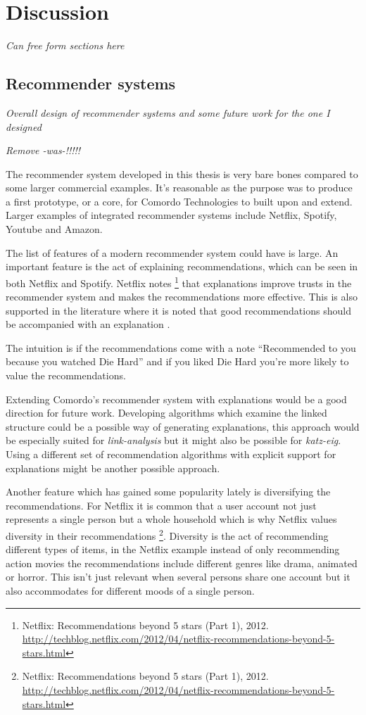 \chapter{Discussion}\label{cha:discussion}

\textit{Can free form sections here}

\section{Recommender systems}

\textit{Overall design of recommender systems and some future work for the one I designed}

\textit{Remove -was-!!!!!}

The recommender system developed in this thesis is very bare bones compared to some larger commercial examples. It's reasonable as the purpose was to produce a first prototype, or a core, for Comordo Technologies to built upon and extend.  Larger examples of integrated recommender systems include Netflix, Spotify, Youtube and Amazon.

The list of features of a modern recommender system could have is large. An important feature is the act of explaining recommendations, which can be seen in both Netflix and Spotify. Netflix notes
\footnote{
Netflix: Recommendations beyond 5 stars (Part 1), 2012.
\url{http://techblog.netflix.com/2012/04/netflix-recommendations-beyond-5-stars.html}
}
that explanations improve trusts in the recommender system and makes the recommendations more effective. This is also supported in the literature where it is noted that good recommendations should be accompanied with an explanation \citep{hu2008collaborative}.

The intuition is if the recommendations come with a note ``Recommended to you because you watched Die Hard'' and if you liked Die Hard you're more likely to value the recommendations.

Extending Comordo's recommender system with explanations would be a good direction for future work. Developing algorithms which examine the linked structure could be a possible way of generating explanations, this approach would be especially suited for \textit{link-analysis} but it might also be possible for \textit{katz-eig}. Using a different set of recommendation algorithms with explicit support for explanations might be another possible approach.

Another feature which has gained some popularity lately \citep{bobadilla2013recommender} is diversifying the recommendations. For Netflix it is common that a user account not just represents a single person but a whole household which is why Netflix values diversity in their recommendations
\footnote{
Netflix: Recommendations beyond 5 stars (Part 1), 2012.
\url{http://techblog.netflix.com/2012/04/netflix-recommendations-beyond-5-stars.html}
}.
Diversity is the act of recommending different types of items, in the Netflix example instead of only recommending action movies the recommendations include different genres like drama, animated or horror. This isn't just relevant when several persons share one account but it also accommodates for different moods of a single person.

